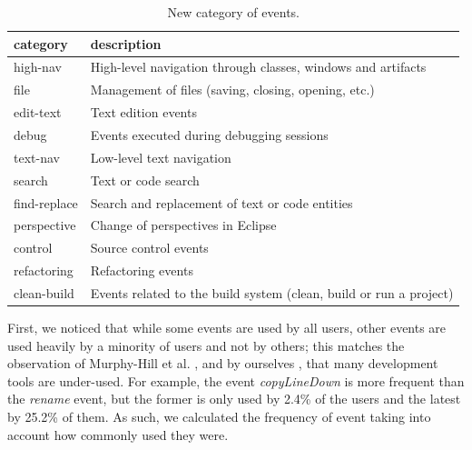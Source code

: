 \documentclass[times]{smrauth}
\begin{document}
\begin{table}[ht!]
	\small
	\renewcommand{\arraystretch}{1.3}
	\caption{New category of events. }
	\label{tbl:new_events_udc}
	\centering
	\begin{tabular}{|p{2.5cm}|p{10 cm}| } %
		\hline 
		category & description \\ %
		\hline 
		\hline 
		high-nav & High-level navigation through classes, windows and artifacts \\ %
		file & Management of files (saving, closing, opening, etc.) \\ %
		edit-text & Text edition events \\ %
		debug & Events executed during debugging sessions \\ %
		text-nav & Low-level text navigation \\ %
		search & Text or code search \\ %
		find-replace & Search and replacement of text or code entities \\ %
		perspective & Change of perspectives in Eclipse \\ %
		control & Source control events \\ %
		refactoring & Refactoring events \\ %
		clean-build &  Events related to the build system (clean, build or run a project) \\ %
		\hline
	\end{tabular}
\end{table}

First, we noticed that while some events are used by all users, other events are used heavily by a minority of users and not by others; this matches the observation of Murphy-Hill et al. \cite{MBP12}, and by ourselves \cite{KubelkaBCGRRS15}, that many development tools are under-used. For example, the event \textit{copyLineDown} is more frequent than the \textit{rename} event, but the former is only used by 2.4\% of the users and the latest by 25.2\% of them. As such, we calculated the frequency of event taking into account how commonly used they were.
\end{document}
